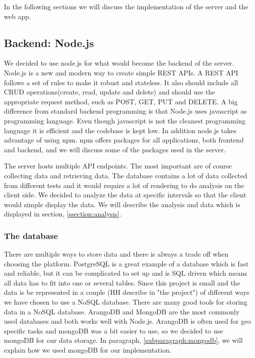 \documentclass[USenglish]{ifimaster}  %
\begin{document}
In the following sections we will discuss the implementation of the server and the web app.

\subsection{Backend: Node.js}
We decided to use node.js for what would become the backend of the server. Node.js is a new and modern way to create simple REST APIs. A REST API follows a set of rules to make it robust and stateless. It also should include all CRUD operations(create, read, update and delete) and should use the appropriate request method, such as POST, GET, PUT and DELETE. A big difference from standard backend programming is that Node.js uses javascript as programming language. Even though javascript is not the cleanest programming language it is efficient and the codebase is kept low. In addition node.js takes advantage of using \acrfull{npm}. \acrshort{npm} offers packages for all applications, both frontend and backend, and we will discuss some of the packages used in the server.

The server hosts multiple API endpoints. The most important are of course collecting data and retrieving data. The database contains a lot of data collected from different tests and it would require a lot of rendering to do analysis on the client side. We decided to analyze the data at specific intervals so that the client would simple display the data. We will describe the analysis and data which is displayed in section, \vref{ssection:analysis}.

\subsubsection{The database}
There are multiple ways to store data and there is always a trade off when choosing the platform. PostgreSQL is a great example of a database which is fast and reliable, but it can be complicated to set up and is SQL driven which means all data has to fit into one or several tables. Since this project is small and the data is be represented in a couple (HH describe in "the project") of different ways we have chosen to use a NoSQL database. There are many good tools for storing data in a NoSQL database. ArangoDB and MongoDB are the most commonly used databases and both works well with Node.js. ArangoDB is often used for geo specific tasks and mongoDB was a bit easier to use, so we decided to use mongoDB for our data storage. In paragraph, \vref{subparagraph:mongodb}, we will explain how we used mongoDB for our implementation.
\end{document}
